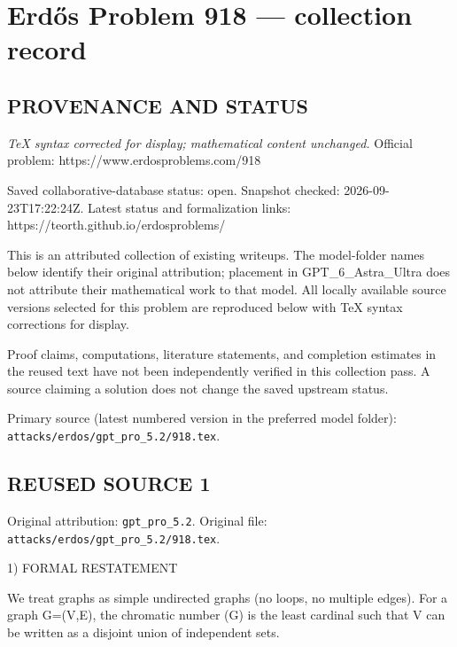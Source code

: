 \section*{Erd\H{o}s Problem 918 --- collection record}

\subsection*{PROVENANCE AND STATUS}

\emph{TeX syntax corrected for display; mathematical content unchanged.}
Official problem: https://www.erdosproblems.com/918

Saved collaborative-database status: open.
Snapshot checked: 2026-09-23T17:22:24Z.
Latest status and formalization links: https://teorth.github.io/erdosproblems/

This is an attributed collection of existing writeups. The model-folder names below identify their original attribution; placement in GPT\_6\_Astra\_Ultra does not attribute their mathematical work to that model. All locally available source versions selected for this problem are reproduced below with TeX syntax corrections for display.

Proof claims, computations, literature statements, and completion estimates in the reused text have not been independently verified in this collection pass. A source claiming a solution does not change the saved upstream status.

Primary source (latest numbered version in the preferred model folder): \texttt{attacks/erdos/gpt\_pro\_5.2/918.tex}.

\subsection*{REUSED SOURCE 1}
Original attribution: \texttt{gpt\_pro\_5.2}.
Original file: \texttt{attacks/erdos/gpt\_pro\_5.2/918.tex}.


1) FORMAL RESTATEMENT

We treat graphs as simple undirected graphs (no loops, no multiple edges).
For a graph G=(V,E), the chromatic number \chi(G) is the least cardinal \kappa such that V can be written as a disjoint union of \kappa independent sets.

